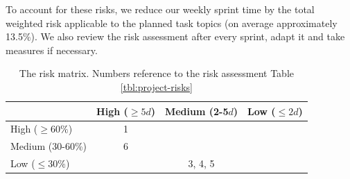 To account for these risks, we reduce our weekly sprint time by the total weighted risk applicable to the planned task topics (on average approximately 13.5\%). We also review the risk assessment after every sprint, adapt it and take measures if necessary.


\begin{table}[h]
    \centering
    \begin{tabu}{|l|c|c|c|}
        \hline
          & High ($\geq 5d$) & Medium (2-5$d$) & Low ($\leq 2d$) \\ \hline
        High ($\geq 60\%$)
          & 1 & & \\ \hline
        Medium (30-60\%)
          & 6 & &  \\ \hline
        Low ($\leq 30\%$)
          & & 3, 4, 5 & \\ \hline
    \end{tabu}
    \caption[Risk matrix]{The risk matrix. Numbers reference to the risk assessment Table \ref{tbl:project-risks}}
    \label{tbl:risk-matrix}
\end{table}


